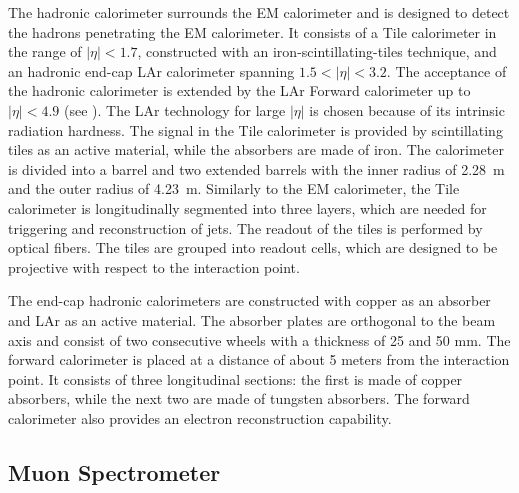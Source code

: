 The hadronic calorimeter surrounds the EM calorimeter and is designed to detect the hadrons penetrating the EM calorimeter.
It consists of a Tile calorimeter in the range of $|\eta|<1.7$, constructed with an iron-scintillating-tiles technique, and an hadronic end-cap LAr calorimeter spanning $1.5<|\eta|<3.2$. The acceptance of the hadronic calorimeter is extended by the LAr Forward calorimeter up to $|\eta|<4.9$ (see ). The LAr technology for large $|\eta|$ is chosen because of its intrinsic radiation hardness.
The signal in the Tile calorimeter is provided by scintillating tiles as an active material, while the absorbers are made of iron. The calorimeter is divided into a barrel and two extended barrels with the inner radius of 2.28~m and the outer radius of 4.23~m. Similarly to the EM calorimeter, the Tile calorimeter is longitudinally segmented into three layers, which are needed for triggering and reconstruction of jets. The readout of the tiles is performed by optical fibers. The tiles are grouped into readout cells, which are designed to be projective with respect to the interaction point.

The end-cap hadronic calorimeters are constructed with copper as an absorber and LAr as an active material. The absorber plates are orthogonal to the beam axis and consist of two consecutive wheels
with a thickness of 25 and 50 mm. The forward calorimeter is placed at a distance of about 5 meters from the interaction point. It consists of three longitudinal sections: the first is made of copper absorbers, while the next two are made of tungsten absorbers. The forward calorimeter also provides an electron reconstruction capability.


\subsection{Muon Spectrometer}

